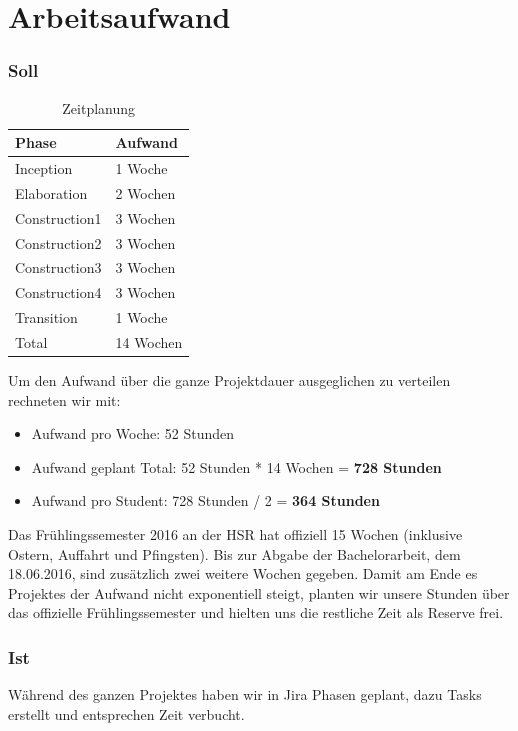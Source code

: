 \section{Arbeitsaufwand}
\subsubsection{Soll}

\begin{table}[H]
	\centering
    \begin{tabular}{|p{6cm}|p{6cm}|}
    \hline    
    \rowcolor{lightblue}
	Phase & Aufwand \\ \hline   
	Inception & 1 Woche \\ \hline
	Elaboration & 2 Wochen \\ \hline
	Construction1 & 3 Wochen \\ \hline
	Construction2 & 3 Wochen \\ \hline
	Construction3 & 3 Wochen \\ \hline
	Construction4 & 3 Wochen \\ \hline
	Transition & 1 Woche \\ \hline
	\rowcolor{lightblue}
	Total & 14 Wochen \\ \hline
    \end{tabular}
    \caption[Zeitplanung]{Zeitplanung}
\end{table}
\medskip
Um den Aufwand über die ganze Projektdauer ausgeglichen zu verteilen rechneten wir mit:
\begin{itemize}
    \item Aufwand pro Woche: 52 Stunden
    \item Aufwand geplant Total: 52 Stunden * 14 Wochen = \textbf{728 Stunden}
    \item Aufwand pro Student: 728 Stunden / 2 = \textbf{364 Stunden}
\end{itemize}

Das Frühlingssemester 2016 an der HSR hat offiziell 15 Wochen  (inklusive Ostern, Auffahrt und Pfingsten). Bis zur Abgabe der Bachelorarbeit, dem 18.06.2016, sind zusätzlich zwei weitere Wochen gegeben. Damit am Ende es Projektes der Aufwand nicht exponentiell steigt, planten wir unsere Stunden über das offizielle Frühlingssemester und hielten uns die restliche Zeit als Reserve frei.
\subsubsection{Ist}
Während des ganzen Projektes haben wir in Jira Phasen geplant, dazu Tasks erstellt und entsprechen Zeit verbucht.

